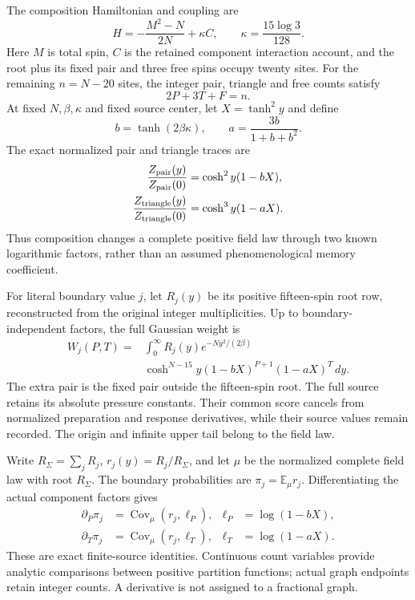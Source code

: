 The composition Hamiltonian and coupling are
\begin{equation}
 H=-\frac{M^2-N}{2N}+\kappa C,\qquad
 \kappa=\frac{15\log3}{128}.
\end{equation}
Here $M$ is total spin, $C$ is the retained component interaction account, and the root plus its fixed pair and three free spins occupy twenty sites. For the remaining $n=N-20$ sites, the integer pair, triangle and free counts satisfy
\begin{equation}
 2P+3T+F=n.
\end{equation}
At fixed $N,\beta,\kappa$ and fixed source center, let $X=\tanh^2y$ and define
\begin{equation}
 b=\tanh(2\beta\kappa),\qquad a=\frac{3b}{1+b+b^2}.
\end{equation}
The exact normalized pair and triangle traces are
\begin{align}
 \frac{Z_{\rm pair}(y)}{Z_{\rm pair}(0)}
 &=\cosh^2y(1-bX),\\
 \frac{Z_{\rm triangle}(y)}{Z_{\rm triangle}(0)}
 &=\cosh^3y(1-aX).
\end{align}
Thus composition changes a complete positive field law through two known logarithmic factors, rather than an assumed phenomenological memory coefficient.

For literal boundary value $j$, let $R_j(y)$ be its positive fifteen-spin root row, reconstructed from the original integer multiplicities. Up to boundary-independent factors, the full Gaussian weight is
\begin{equation}
\begin{aligned}
 W_j(P,T)={}&\int_0^\infty R_j(y)e^{-Ny^2/(2\beta)}\\
 &\cosh^{N-15}y(1-bX)^{P+1}(1-aX)^T\,dy.
\end{aligned}
\end{equation}
The extra pair is the fixed pair outside the fifteen-spin root. The full source retains its absolute pressure constants. Their common score cancels from normalized preparation and response derivatives, while their source values remain recorded. The origin and infinite upper tail belong to the field law.

Write $R_\Sigma=\sum_jR_j$, $r_j(y)=R_j/R_\Sigma$, and let $\mu$ be the normalized complete field law with root $R_\Sigma$. The boundary probabilities are $\pi_j=\mathbb E_\mu r_j$. Differentiating the actual component factors gives
\begin{align}
 \partial_P\pi_j&=\operatorname{Cov}_\mu(r_j,\ell_P),
 &\ell_P&=\log(1-bX),\\
 \partial_T\pi_j&=\operatorname{Cov}_\mu(r_j,\ell_T),
 &\ell_T&=\log(1-aX).
\end{align}
These are exact finite-source identities. Continuous count variables provide analytic comparisons between positive partition functions; actual graph endpoints retain integer counts. A derivative is not assigned to a fractional graph.

